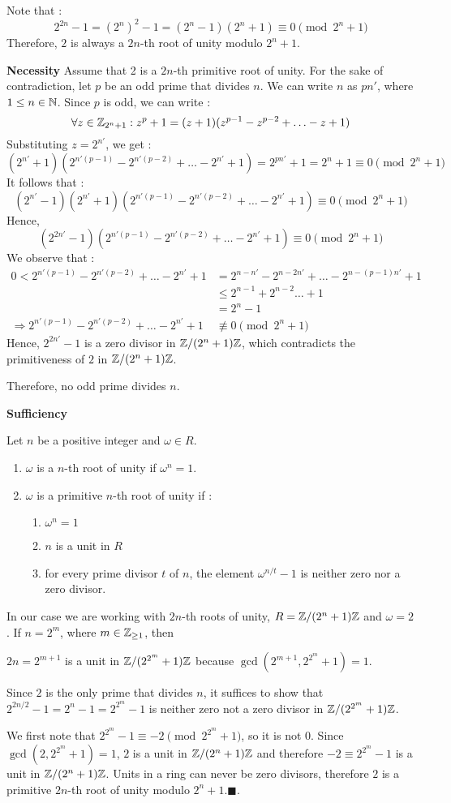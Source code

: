 Note that : 
\[2^{2n}-1 = (2^n)^2 - 1 = (2^n - 1)(2^n+1) \equiv 0 \pmod{2^n + 1}\]
Therefore, $2$ is always a $2n$-th root of unity modulo $2^n + 1$.

\textbf{Necessity}
Assume that 2 is a $2n$-th primitive root of unity.
For the sake of contradiction, let $p$ be an odd prime that divides $n$. We can write $n$ as $pn'$, where $1\leq n \in \mathbb{N}$. Since $p$ is odd, we can write :
\[\forall z \in \mathbb{Z}_{2^n+1}: z^p + 1 = (z+1)(z^{p-1}-z^{p-2}+\ldots-z+1)\]
Substituting $z=2^{n'}$, we get : 
\[(2^{n'}+1)(2^{n'(p-1)}-2^{n'(p-2)}+\ldots-2^{n'}+1) = 2^{pn'}+1 = 2^n+1 \equiv 0 \pmod{2^n+1}\]
It follows that : 
\[(2^{n'}-1)(2^{n'}+1)(2^{n'(p-1)}-2^{n'(p-2)}+\ldots-2^{n'}+1)\equiv 0 \pmod{2^n + 1}\]
Hence, 
\[(2^{2n'}-1)(2^{n'(p-1)}-2^{n'(p-2)}+\ldots-2^{n'}+1)\equiv 0 \pmod{2^n + 1}\]
We observe that :
\begin{align*}
    0 < 2^{n'(p-1)}-2^{n'(p-2)}+\ldots-2^{n'}+1 &= 2^{n-n'}-2^{n-2n'}+\ldots - 2^{n-(p-1)n'}+1 \\
    &\le 2^{n-1} + 2^{n-2} \ldots + 1 \\
    &= 2^n - 1 \\
    \Rightarrow 2^{n'(p-1)}-2^{n'(p-2)}+\ldots-2^{n'}+1 &\not\equiv 0 \pmod{2^n+1}
\end{align*}
Hence, $2^{2n'}-1$ is a zero divisor in $\mathbb{Z}/(2^n+1)\mathbb{Z}$, which contradicts the primitiveness of $2$ in $\mathbb{Z}/(2^n+1)\mathbb{Z}$.

Therefore, no odd prime divides $n$.

\textbf{Sufficiency}

Let $n$ be a positive integer and $\omega\in R$.
\begin{enumerate}
    \item $\omega$ is a $n$-th root of unity if $\omega^n = 1$.
    \item $\omega$ is a primitive $n$-th root of unity if :
    \begin{enumerate}
        \item $\omega^n = 1$
        \item $n$ is a unit in $R$
        \item for every prime divisor $t$ of $n$, the element $\omega^{n/t}-1$ is neither zero nor a zero divisor.
    \end{enumerate}
\end{enumerate}

In our case we are working with $2n$-th roots of unity, $R = \mathbb{Z}/(2^n+1)\mathbb{Z}$ and $\omega = 2$. If $n=2^m$, where $m\in \mathbb{Z}_{\geq 1}$, then

$2n = 2^{m+1}$ is a unit in $\mathbb{Z}/(2^{2^m}+1)\mathbb{Z}$ because $\gcd(2^{m+1},2^{2^m}+1) = 1$. 

Since $2$ is the only prime that divides $n$, it suffices to show that $2^{2n/2}-1 = 2^n-1 = 2^{2^m}-1$ is neither zero not a zero divisor in $\mathbb{Z}/(2^{2^m}+1)\mathbb{Z}$. 

We first note that $2^{2^m}-1 \equiv -2 \pmod{2^{2^m}+1}$, so it is not $0$. Since $\gcd(2,2^{2^m}+1) = 1$, $2$ is a unit in $\mathbb{Z}/(2^n+1)\mathbb{Z}$ and therefore $-2\equiv 2^{2^m}-1$ is a unit in $\mathbb{Z}/(2^n+1)\mathbb{Z}$. Units in a ring can never be zero divisors, therefore $2$ is a primitive $2n$-th root of unity modulo $2^n+1$.\hfill $\blacksquare$.


